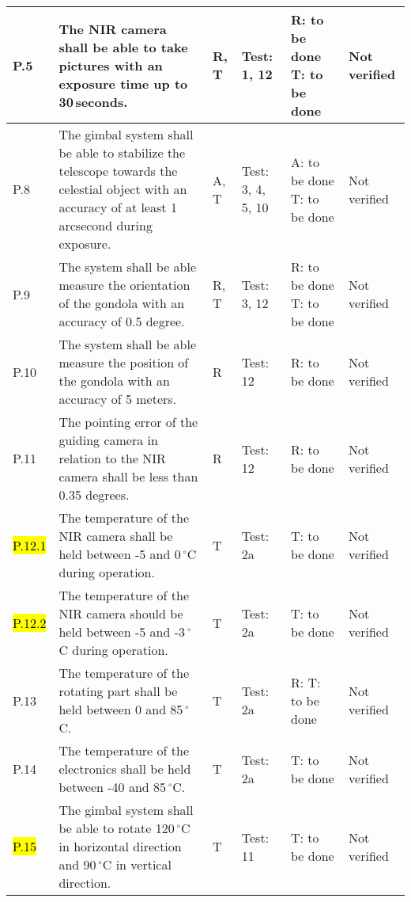 \begin{longtable}[]{|m{}| m{}|m{}|m{}|m{}|m{}|}
P.5 & The NIR camera shall be able to take pictures with an exposure time up to 30\,seconds.
& R, T & Test: 1, 12 & R: to be done \newline T: to be done & Not verified \\\hline

  P.8 & The gimbal system shall be able to stabilize the telescope towards the celestial object with an accuracy of at least 1 arcsecond during exposure.
& A, T & Test: 3, 4, 5, 10 & A: to be done \newline T: to be done & Not verified \\\hline

  P.9 & The system shall be able measure the orientation of the gondola with an accuracy of 0.5 degree.
& R, T & Test: 3, 12 & R: to be done \newline T: to be done  & Not verified \\\hline

  P.10 & The system shall be able measure the position of the gondola with an accuracy of 5 meters.
& R & Test: 12 & R: to be done & Not verified \\\hline

  P.11 & The pointing error of the guiding camera in relation to the NIR camera shall be less than 0.35 degrees.
& R & Test: 12 & R: to be done & Not verified \\\hline

  \hl{P.12.1} & The temperature of the NIR camera shall be held between -5 and 0\,$^\circ$C during operation.
& T & Test: 2a & T: to be done & Not verified \\\hline

  \hl{P.12.2} & The temperature of the NIR camera should be held between -5 and -3\,$^\circ$C during operation.
& T & Test: 2a &  T: to be done & Not verified \\\hline

  P.13 & The temperature of the rotating part shall be held between 0 and 85\,$^\circ$C.
& T & Test: 2a & R: T: to be done & Not verified \\\hline

  P.14 & The temperature of the electronics shall be held between -40 and 85\,$^\circ$C.
& T & Test: 2a & T: to be done & Not verified \\\hline

\hl{P.15} & The gimbal system shall be able to rotate 120\,$^\circ$C in horizontal direction and 90\,$^\circ$C in vertical direction.
& T & Test: 11 & T: to be done & Not verified \\\hline




\end{longtable}
